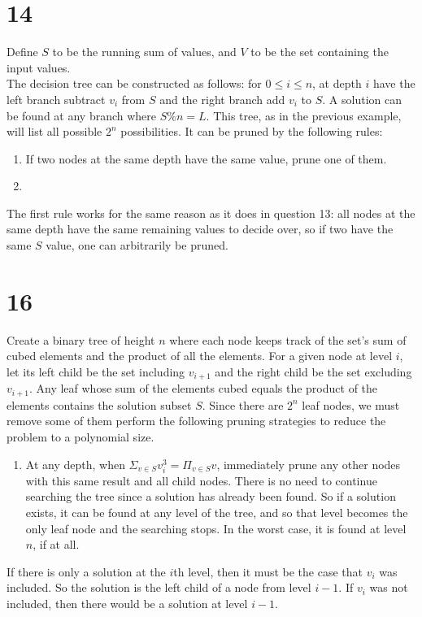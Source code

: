 \documentclass[letterpaper,notitlepage,twoside]{article}
\begin{document}
\section*{14}
Define $S$ to be the running sum of values, and $V$ to be the set containing the input values. \\
The decision tree can be constructed as follows: for $0\leq i \leq n$, at depth $i$ have the left branch subtract $v_i$ from $S$ and the right branch add $v_i$ to $S$. A solution can be found at any branch where $S\% n = L$. This tree, as in the previous example, will list all possible $2^n$ possibilities. It can be pruned by the following rules:   
\begin{enumerate}
\item If two nodes at the same depth have the same value, prune one of them. 
\item
\end{enumerate}
The first rule works for the same reason as it does in question 13: all nodes at the same depth have the same remaining values to decide over, so if two have the same $S$ value, one can arbitrarily be pruned.

\section*{16}
Create a binary tree of height $n$ where each node keeps track of the set's sum of cubed elements and the product of all the elements. For a given node at level $i$, let its left child be the set including $v_{i + 1}$ and the right child be the set excluding $v_{i + 1}$. Any leaf whose sum of the elements cubed equals the product of the elements contains the solution subset $S$. Since there are $2^n$ leaf nodes, we must remove some of them perform the following pruning strategies to reduce the problem to a polynomial size.

\begin{enumerate}
\item At any depth, when $\Sigma_{v \in S} v_i^3 = \Pi_{v \in S} v$, immediately prune any other nodes with this same result and all child nodes. There is no need to continue searching the tree since a solution has already been found. So if a solution exists, it can be found at any level of the tree, and so that level becomes the only leaf node and the searching stops. In the worst case, it is found at level $n$, if at all.
\end{enumerate}

If there is only a solution at the $i$th level, then it must be the case that $v_i$ was included. So the solution is the left child of a node from level $i - 1$. If $v_i$ was not included, then there would be a solution at level $i - 1$.\\\\
\end{document}
